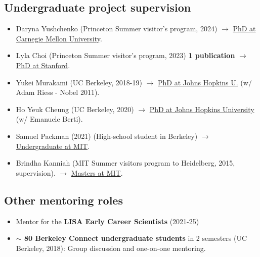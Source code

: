 \documentclass[11pt,a4paper]{article}
\begin{document}
\subsection*{Undergraduate project supervision}

\begin{itemize}\setlength{\itemsep}{1pt}
\item  {Daryna Yushchenko} (Princeton Summer visitor's program, 2024)
 $\to$    \underline{PhD at Carnegie Mellon University}.
\item  {Lyla Choi} (Princeton Summer visitor's program, 2023) \textbf{1 publication} $\to$ \underline{PhD at Stanford}. %
 
\item  {Yukei Murakami} (UC Berkeley, 2018-19) %
 $\to$    \underline{PhD at Johns Hopkins U.} (w/ Adam Riess - Nobel 2011).
\item {Ho Yeuk Cheung} (UC Berkeley, 2020) %
 $\to$    \underline{PhD at Johns Hopkins University} (w/ Emanuele Berti).

    \item {Samuel Packman} (2021) (High-school student in Berkeley) $\to$ \underline{Undergraduate at MIT}.

 \item {Brindha Kanniah} (MIT Summer visitors program to Heidelberg, 2015, supervision). %
 $\longrightarrow$ \underline{Masters at MIT}.
\end{itemize}

\subsection*{Other mentoring roles}\setlength{\itemsep}{1pt}
\begin{itemize}\setlength{\itemsep}{1pt}
 \item Mentor for the \textbf{LISA Early Career Scientists} (2021-25) %
\item \textbf{$\sim$ 80 Berkeley Connect undergraduate students} in 2 semesters (UC Berkeley, 2018): Group discussion and one-on-one mentoring.
\end{itemize}
\end{document}
